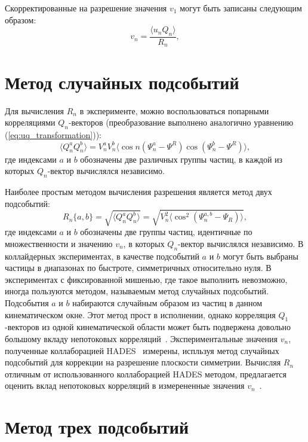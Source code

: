 Скорректированные на разрешение значения $v_1$ могут быть записаны следующим образом: 
%
\begin{equation}
    v_n =  \frac{ \langle u_n Q_n \rangle }{R_n},
    \label{eq:v1_formula}
\end{equation}
%

\section{Метод случайных подсобытий}

Для вычисления $R_n$ в эксперименте, можно воспользоваться попарными корреляциями $Q_n$-векторов (преобразование выполнено аналогично уравнению (\ref{eq:uq_transformation})): 
%
\begin{equation}
    \langle Q_n^a Q_n^b \rangle = V^a_n V^b_n \langle \cos n (\Psi^a_n - \Psi^R) \cos(\Psi^b_n - \Psi^R) \rangle,
\end{equation}
%
где индексами $a$ и $b$ обозначены две различных группы частиц, в каждой из которых $Q_n$-вектор вычислялся независимо.

Наиболее простым методом вычисления разрешения является метод двух подсобытий:
%
\begin{equation}
    R_n\{a,b\} = \sqrt{ \langle Q_n^a Q_n^b \rangle } = \sqrt{ V_n^2 \langle \cos^{2}( \Psi^{a,b}_n - \Psi_R ) \rangle },
\end{equation}
где индексами $a$ и $b$ обозначены две группы частиц, идентичные по множественности и значению $v_n$, в которых $Q_n$-вектор вычислялся независимо.
В коллайдерных экспериментах, в качестве подсобытий $a$ и $b$ могут быть выбраны частицы в диапазонах по быстроте, симметричных относительно нуля.
В экспериментах с фиксированной мишенью, где такое выполнить невозможно, иногда пользуются методом, называемым метод случайных подсобытий.
Подсобытия $a$ и $b$ набираются случайным образом из частиц в данном кинематическом окне.
Этот метод прост в исполнении, однако корреляция $Q_1$-векторов из одной кинематической области может быть подвержена довольно большому вкладу непотоковых корреляций~\cite{Mamaev:2020lpi}.
Экспериментальные значения $v_n$, полученные коллаборацией HADES~\cite{HADES:2020lob} измерены, испльзуя метод случайных подсобытий для коррекции на разрешение плоскости симметрии. 
Вычисляя $R_n$ отличным от использованного коллаборацией HADES методом, предлагается оценить вклад непотоковых корреляций в измерененные значения $v_n$~\cite{Mamaev:2020lpi,Mamaev:2020}.

\section{Метод трех подсобытий}

